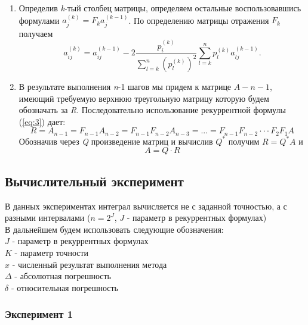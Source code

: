 \documentclass[14pt, titlepage, a4paper]{extarticle} %
\begin{document}
\begin{enumerate}
		\item Определив \textit{k}-тый столбец матрицы, определяем остальные воспользовавшись формулами $a_j^{(k)} = F_k a_j^{(k-1)}$. По определению матрицы отражения $F_k$ получаем
		\begin{equation}\label{eq:4}
			a_{ij}^{(k)} = a_{ij}^{(k-1)} - 2 \frac{p_i^{(k)}}{\sum_{l=k}^{n}(p_l^{(k)})^2}\sum_{l=k}^{n}p_l^{(k)}a_{lj}^{(k-1)}.
		\end{equation}
		
		\item В результате выполнения \textit{n}-1 шагов мы придем к матрице $A-{n-1}$, имеющий требуемую верхнюю треугольную матрицу которую будем обозначать за \textit{R}. Последовательно использование рекуррентной формулы (\ref{eq:3}) дает:
		$$R = A_{n-1} = F_{n-1}A_{n-2} = F_{n-1}F_{n-2}A_{n-3} = ... = F_{n-1}F_{n-2} \cdot \cdot \cdot F_2F_1A$$
		Обозначив через \textit{Q} произведение матриц и вычислив $Q^*$ получим $R = Q^*A$ и 
		$$A = Q\cdot R$$
		
	\end{enumerate}
	
	
	\pagebreak
	\subsection*{Вычислительный эксперимент}
	
	В данных экспериментах интеграл вычисляется не с заданной точностью, а с разными интервалами ($n = 2^{J}$, $J$ - параметр в рекуррентных формулах)\vspace{5pt}
	~\\
	В дальнейшем будем использовать следующие обозначения:\\
	$J$ - параметр в рекуррентных формулах\\
	$K$ - параметр точности\\
	$x$ - численный результат выполнения метода\\
	$\Delta$ - абсолютная погрешность\\
	$\delta$ - относительная погрешность
	 
	\subsubsection*{Эксперимент 1}

	
	
	\pagebreak
	
\end{document}
